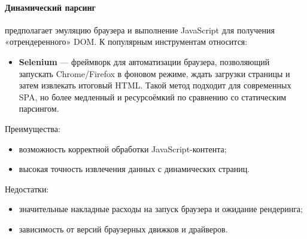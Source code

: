 \paragraph{Динамический парсинг} предполагает эмуляцию браузера и выполнение JavaScript для получения «отрендеренного» DOM. К популярным инструментам относится:
\begin{itemize}
    \item \textbf{Selenium}\cite{SeleniumDocumentation} — фреймворк для автоматизации браузера, позволяющий запускать Chrome/Firefox в фоновом режиме, ждать загрузки страницы и затем извлекать итоговый HTML. Такой метод подходит для современных SPA, но более медленный и ресурсоёмкий по сравнению со статическим парсингом\cite{MozillaWebScraping2022}.
\end{itemize}
Преимущества:
\begin{itemize}
    \item возможность корректной обработки JavaScript-контента;
    \item высокая точность извлечения данных с динамических страниц.
\end{itemize}
Недостатки:
\begin{itemize}
    \item значительные накладные расходы на запуск браузера и ожидание рендеринга;
    \item зависимость от версий браузерных движков и драйверов\cite{PatilWebScraping2021}.
\end{itemize}

